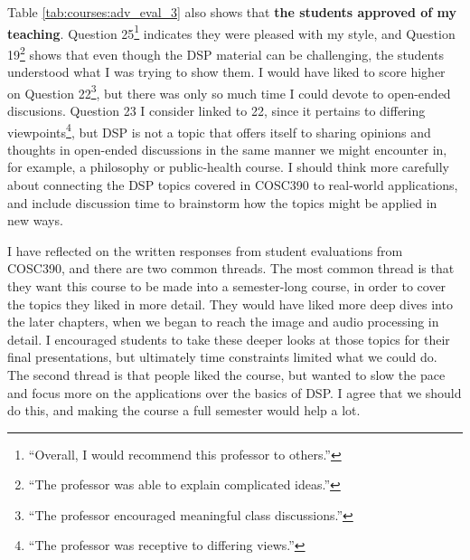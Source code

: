 \documentclass[../../main.tex]{subfiles}
\begin{document}
Table \ref{tab:courses:adv_eval_3} also shows that \textbf{the students approved of my teaching}.  Question 25\footnote{``Overall, I would recommend this professor to others.''} indicates they were pleased with my style, and Question 19\footnote{``The professor was able to explain complicated ideas.''} shows that even though the DSP material can be challenging, the students understood what I was trying to show them.  I would have liked to score higher on Question 22\footnote{``The professor encouraged meaningful class discussions.''}, but there was only so much time I could devote to open-ended discusions.  Question 23 I consider linked to 22, since it pertains to differing viewpoints\footnote{``The professor was receptive to differing views.''}, but DSP is not a topic that offers itself to sharing opinions and thoughts in open-ended discussions in the same manner we might encounter in, for example, a philosophy or public-health course.  I should think more carefully about connecting the DSP topics covered in COSC390 to real-world applications, and include discussion time to brainstorm how the topics might be applied in new ways. \\ \hspace{0.1cm}

I have reflected on the written responses from student evaluations from COSC390, and there are two common threads.  The most common thread is that they want this course to be made into a semester-long course, in order to cover the topics they liked in more detail.  They would have liked more deep dives into the later chapters, when we began to reach the image and audio processing in detail.  I encouraged students to take these deeper looks at those topics for their final presentations, but ultimately time constraints limited what we could do.  The second thread is that people liked the course, but wanted to slow the pace and focus more on the applications over the basics of DSP.  I agree that we should do this, and making the course a full semester would help a lot. \\ \hspace{0.1cm}
\end{document}
